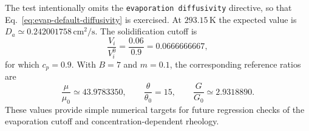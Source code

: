 The test intentionally omits the \texttt{evaporation diffusivity}
directive, so that Eq.~\ref{eq:evap-default-diffusivity} is exercised.
At $293.15\,\mathrm{K}$ the expected value is
$D_a\simeq0.242001758\,\mathrm{cm^2/s}$. The solidification cutoff is
\begin{equation}
 \frac{V_i}{V_i^0}=\frac{0.06}{0.9}=0.0666666667,
\end{equation}
for which $c_p=0.9$. With $B=7$ and $m=0.1$, the corresponding
reference ratios are
\begin{equation}
 \frac{\mu}{\mu_0}\simeq43.9783350,\qquad
 \frac{\theta}{\theta_0}=15,\qquad
 \frac{G}{G_0}\simeq2.9318890.
\end{equation}
These values provide simple numerical targets for future regression
checks of the evaporation cutoff and concentration-dependent rheology.
